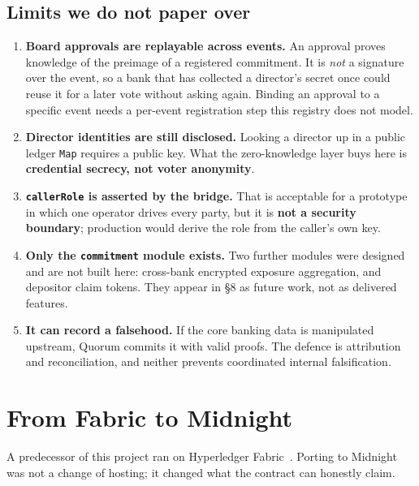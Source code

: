 \documentclass[11pt,a4paper]{article}
\begin{document}
\subsection{Limits we do not paper over}

\begin{enumerate}
  \item \textbf{Board approvals are replayable across events.} An approval proves knowledge of the
    preimage of a registered commitment. It is \emph{not} a signature over the event, so a bank that has
    collected a director's secret once could reuse it for a later vote without asking again. Binding an
    approval to a specific event needs a per-event registration step this registry does not model.
  \item \textbf{Director identities are still disclosed.} Looking a director up in a public ledger
    \texttt{Map} requires a public key. What the zero-knowledge layer buys here is \textbf{credential
    secrecy, not voter anonymity}.
  \item \textbf{\texttt{callerRole} is asserted by the bridge.} That is acceptable for a prototype in
    which one operator drives every party, but it is \textbf{not a security boundary}; production would
    derive the role from the caller's own key.
  \item \textbf{Only the \texttt{commitment} module exists.} Two further modules were designed and are not
    built here: cross-bank encrypted exposure aggregation, and depositor claim tokens. They appear in
    \S8 as future work, not as delivered features.
  \item \textbf{It can record a falsehood.} If the core banking data is manipulated upstream, Quorum
    commits it with valid proofs. The defence is attribution and reconciliation, and neither prevents
    coordinated internal falsification.
\end{enumerate}

\section{From Fabric to Midnight}

A predecessor of this project ran on Hyperledger Fabric~\cite{fabric}. Porting to Midnight was not a
change of hosting; it changed what the contract can honestly claim.
\end{document}
